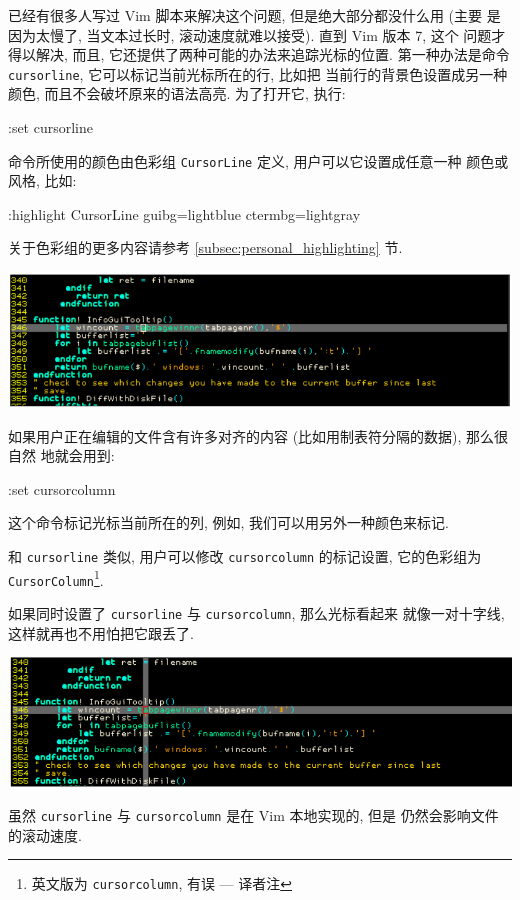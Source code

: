 已经有很多人写过 Vim 脚本来解决这个问题, 但是绝大部分都没什么用 (主要 
是因为太慢了, 当文本过长时, 滚动速度就难以接受). 直到 Vim 版本 7, 这个 
问题才得以解决, 而且, 它还提供了两种可能的办法来追踪光标的位置.
第一种办法是命令 \texttt{cursorline}, 它可以标记当前光标所在的行, 比如把
当前行的背景色设置成另一种颜色, 而且不会破坏原来的语法高亮. 为了打开它,
执行:
\begin{vimcmd}
:set cursorline
\end{vimcmd}
命令所使用的颜色由色彩组 \texttt{CursorLine} 定义, 用户可以它设置成任意一种
颜色或风格, 比如:
\begin{vimcmd}
:highlight CursorLine guibg=lightblue ctermbg=lightgray
\end{vimcmd}
关于色彩组的更多内容请参考 \ref{subsec:personal_highlighting} 节.

\begin{center}
    \includegraphics[scale=0.5]{./images/page38-1.png}
\end{center}

如果用户正在编辑的文件含有许多对齐的内容 (比如用制表符分隔的数据), 那么很自然
地就会用到:
\begin{vimcmd}
:set cursorcolumn
\end{vimcmd}

这个命令标记光标当前所在的列, 例如, 我们可以用另外一种颜色来标记.

和 \texttt{cursorline} 类似, 用户可以修改 \texttt{cursorcolumn} 的标记设置,
它的色彩组为 \texttt{CursorColumn}\footnote{英文版为
\texttt{cursorcolumn}, 有误 --- 译者注}.

如果同时设置了 \texttt{cursorline} 与 \texttt{cursorcolumn}, 那么光标看起来
就像一对十字线, 这样就再也不用怕把它跟丢了.
\begin{center}
    \includegraphics[scale=0.45]{./images/page38-2.png}
\end{center}
\begin{warning}
虽然 \texttt{cursorline} 与 \texttt{cursorcolumn} 是在 Vim 本地实现的, 但是 
仍然会影响文件的滚动速度.
\end{warning}


